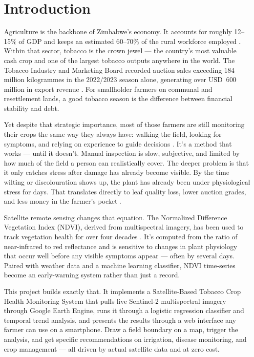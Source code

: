 \documentclass[12pt,a4paper]{report}
\begin{document}
\section{Introduction}

Agriculture is the backbone of Zimbabwe's economy. It accounts for roughly 12--15\% of GDP and keeps an estimated 60--70\% of the rural workforce employed \citep{moa2022}. Within that sector, tobacco is the crown jewel — the country's most valuable cash crop and one of the largest tobacco outputs anywhere in the world. The Tobacco Industry and Marketing Board recorded auction sales exceeding 184 million kilogrammes in the 2022/2023 season alone, generating over USD~600 million in export revenue \citep{timb2023}. For smallholder farmers on communal and resettlement lands, a good tobacco season is the difference between financial stability and debt.

Yet despite that strategic importance, most of those farmers are still monitoring their crops the same way they always have: walking the field, looking for symptoms, and relying on experience to guide decisions \citep{nyoka2020}. It's a method that works — until it doesn't. Manual inspection is slow, subjective, and limited by how much of the field a person can realistically cover. The deeper problem is that it only catches stress after damage has already become visible. By the time wilting or discolouration shows up, the plant has already been under physiological stress for days. That translates directly to leaf quality loss, lower auction grades, and less money in the farmer's pocket \citep{rwizi2021}.

Satellite remote sensing changes that equation. The Normalized Difference Vegetation Index (NDVI), derived from multispectral imagery, has been used to track vegetation health for over four decades \citep{rouse1974}. It's computed from the ratio of near-infrared to red reflectance and is sensitive to changes in plant physiology that occur well before any visible symptoms appear — often by several days. Paired with weather data and a machine learning classifier, NDVI time-series become an early-warning system rather than just a record.

This project builds exactly that. It implements a Satellite-Based Tobacco Crop Health Monitoring System that pulls live Sentinel-2 multispectral imagery through Google Earth Engine, runs it through a logistic regression classifier and temporal trend analysis, and presents the results through a web interface any farmer can use on a smartphone. Draw a field boundary on a map, trigger the analysis, and get specific recommendations on irrigation, disease monitoring, and crop management — all driven by actual satellite data and at zero cost.
\end{document}
